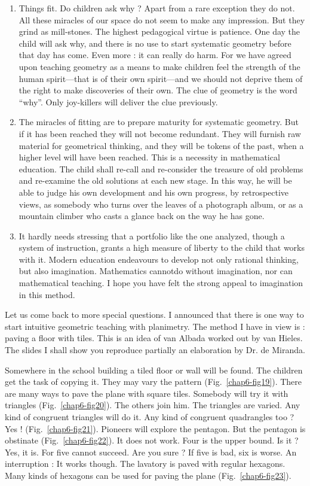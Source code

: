 \begin{enumerate}
\item Things fit. Do children ask why ? Apart from a rare exception they do not. All these miracles of our space do not seem to make any impression. But they grind as mill-stones. The highest pedagogical virtue is patience. One day the child will ask why, and there is no use to start systematic geometry before that day has come. Even more : it can really do harm. For we have agreed upon teaching geometry as a means to make children feel the strength of the human spirit---that is of their own spirit---and we should not deprive them of the right to make discoveries of their own. The clue of geometry is the word ``why''. Only joy-killers will deliver the clue previously.

\item The miracles of fitting are to prepare maturity for systematic geometry. But if it has been reached they will not become redundant. They will furnish raw material for geometrical thinking, and they will be tokens of the past, when a higher level will have been reached. This is a necessity in mathematical education. The child shall re-call and re-consider the treasure of old problems and re-examine the old solutions at each new stage. In this way, he will be able to judge his own development and his own progress, by retrospective views, as somebody who turns over the leaves of a photograph album, or as a mountain climber who casts a glance back on the way he has gone.

\item It hardly needs stressing that a portfolio like the one analyzed, though a system of instruction, grants a high measure of liberty to the child that works with it. Modern education endeavours to develop not only rational thinking, but also imagination. Mathematics cannot\pageoriginale do without imagination, nor can mathematical teaching. I hope you have felt the strong appeal to imagination in this method.
\end{enumerate}

Let us come back to more special questions. I announced that there is one way to start intuitive geometric teaching with planimetry. The method I have in view is : paving a floor with tiles. This is an idea of van Albada worked out by van Hieles. The slides I shall show you reproduce partially an elaboration by Dr. de Miranda.

Somewhere in the school building a tiled floor or wall will be found. The children get the task of copying it. They may vary the pattern (Fig.~\ref{chap6-fig19}). There are many ways to pave the plane with square tiles. Somebody will try it with triangles (Fig.~\ref{chap6-fig20}). The others join him. The triangles are varied. Any kind of congruent triangles will do it. Any kind of congruent quadrangles too ? Yes ! (Fig.~\ref{chap6-fig21}). Pioneers will explore the pentagon. But the pentagon is obstinate (Fig.~\ref{chap6-fig22}). It does not work. Four is the upper bound. Is it ? Yes, it is. For five cannot succeed. Are you sure ? If five is bad, six is worse. An interruption : It works though. The lavatory is paved with regular hexagons. Many kinds of hexagons can be used for paving the plane (Fig.~\ref{chap6-fig23}).

